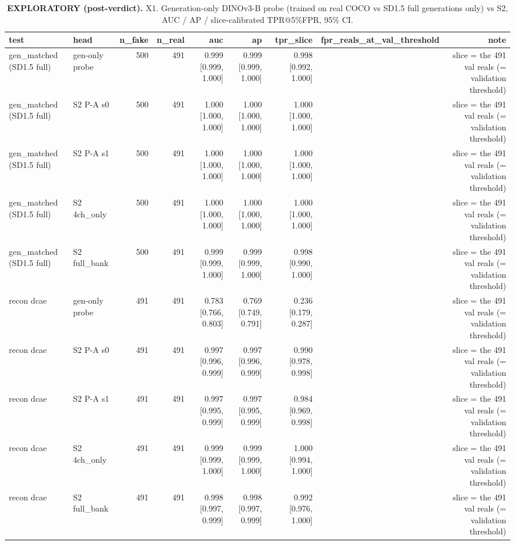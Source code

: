 \begin{table}[htbp]
\centering
\scriptsize
\caption{\textbf{EXPLORATORY (post-verdict).} X1. Generation-only DINOv3-B probe (trained on real COCO vs SD1.5 full generations only) vs S2, AUC / AP / slice-calibrated TPR@5\%FPR, 95\% CI.}
\label{tab:x1-results}
\begin{tabular}{llrrrrrrr}
\toprule
test & head & n\_fake & n\_real & auc & ap & tpr\_slice & fpr\_reals\_at\_val\_threshold & note \\
\midrule
gen\_matched (SD1.5 full) & gen-only probe & 500 & 491 & 0.999 [0.999, 1.000] & 0.999 [0.999, 1.000] & 0.998 [0.992, 1.000] &  & slice = the 491 val reals (= validation threshold) \\
gen\_matched (SD1.5 full) & S2 P-A s0 & 500 & 491 & 1.000 [1.000, 1.000] & 1.000 [1.000, 1.000] & 1.000 [1.000, 1.000] &  & slice = the 491 val reals (= validation threshold) \\
gen\_matched (SD1.5 full) & S2 P-A s1 & 500 & 491 & 1.000 [1.000, 1.000] & 1.000 [1.000, 1.000] & 1.000 [1.000, 1.000] &  & slice = the 491 val reals (= validation threshold) \\
gen\_matched (SD1.5 full) & S2 4ch\_only & 500 & 491 & 1.000 [1.000, 1.000] & 1.000 [1.000, 1.000] & 1.000 [1.000, 1.000] &  & slice = the 491 val reals (= validation threshold) \\
gen\_matched (SD1.5 full) & S2 full\_bank & 500 & 491 & 0.999 [0.999, 1.000] & 0.999 [0.999, 1.000] & 0.998 [0.990, 1.000] &  & slice = the 491 val reals (= validation threshold) \\
recon dcae & gen-only probe & 491 & 491 & 0.783 [0.766, 0.803] & 0.769 [0.749, 0.791] & 0.236 [0.179, 0.287] &  & slice = the 491 val reals (= validation threshold) \\
recon dcae & S2 P-A s0 & 491 & 491 & 0.997 [0.996, 0.999] & 0.997 [0.996, 0.999] & 0.990 [0.978, 0.998] &  & slice = the 491 val reals (= validation threshold) \\
recon dcae & S2 P-A s1 & 491 & 491 & 0.997 [0.995, 0.999] & 0.997 [0.995, 0.999] & 0.984 [0.969, 0.998] &  & slice = the 491 val reals (= validation threshold) \\
recon dcae & S2 4ch\_only & 491 & 491 & 0.999 [0.999, 1.000] & 0.999 [0.999, 1.000] & 1.000 [0.994, 1.000] &  & slice = the 491 val reals (= validation threshold) \\
recon dcae & S2 full\_bank & 491 & 491 & 0.998 [0.997, 0.999] & 0.998 [0.997, 0.999] & 0.992 [0.976, 1.000] &  & slice = the 491 val reals (= validation threshold) \\

\end{tabular}
\end{table}
